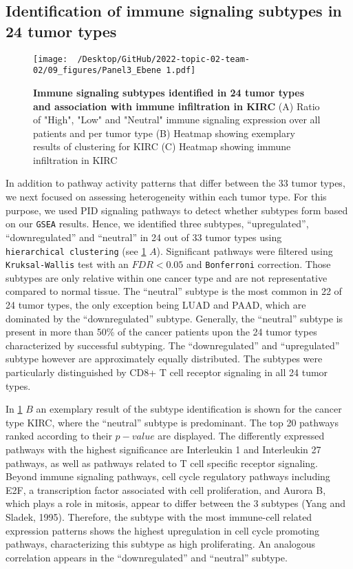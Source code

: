 \documentclass[
  parskip,
  oneside]{scrreprt}
\begin{document}
\hypertarget{identification-of-immune-signaling-subtypes-in-24-tumor-types}{%
\subsection{Identification of immune signaling subtypes in 24 tumor
types}\label{identification-of-immune-signaling-subtypes-in-24-tumor-types}}

\begin{figure}
  \texttt{[image: ~/Desktop/GitHub/2022-topic-02-team-02/09\_figures/Panel3\_Ebene 1.pdf]}
  \caption{\textbf{Immune signaling subtypes identified in 24 tumor types and association with immune infiltration in KIRC} (A) Ratio of "High", "Low" and "Neutral" immune signaling expression over all patients and per tumor type (B) Heatmap showing exemplary results of clustering for KIRC (C) Heatmap showing immune infiltration in KIRC}
  \label{pengplot}
\end{figure}

In addition to pathway activity patterns that differ between the 33
tumor types, we next focused on assessing heterogeneity within each
tumor type. For this purpose, we used PID signaling pathways to detect
whether subtypes form based on our \texttt{GSEA} results. Hence, we
identified three subtypes, ``upregulated'', ``downregulated'' and
``neutral'' in 24 out of 33 tumor types using
\texttt{hierarchical\ clustering} (see \cref{pengplot} \(A\)).
Significant pathways were filtered using \texttt{Kruksal-Wallis} test
with an \(FDR < 0.05\) and \texttt{Bonferroni} correction. Those
subtypes are only relative within one cancer type and are not
representative compared to normal tissue. The ``neutral'' subtype is the
most common in 22 of 24 tumor types, the only exception being LUAD and
PAAD, which are dominated by the ``downregulated'' subtype. Generally,
the ``neutral'' subtype is present in more than 50\% of the cancer
patients upon the 24 tumor types characterized by successful subtyping.
The ``downregulated'' and ``upregulated'' subtype however are
approximately equally distributed. The subtypes were particularly
distinguished by CD8+ T cell receptor signaling in all 24 tumor types.

In \cref{pengplot} \(B\) an exemplary result of the subtype
identification is shown for the cancer type KIRC, where the ``neutral''
subtype is predominant. The top 20 pathways ranked according to their
\(p-value\) are displayed. The differently expressed pathways with the
highest significance are Interleukin 1 and Interleukin 27 pathways, as
well as pathways related to T cell specific receptor signaling. Beyond
immune signaling pathways, cell cycle regulatory pathways including E2F,
a transcription factor associated with cell proliferation, and Aurora B,
which plays a role in mitosis, appear to differ between the 3 subtypes
(Yang and Sladek, 1995). Therefore, the subtype with the most
immune-cell related expression patterns shows the highest upregulation
in cell cycle promoting pathways, characterizing this subtype as high
proliferating. An analogous correlation appears in the ``downregulated''
and ``neutral'' subtype.
\end{document}
